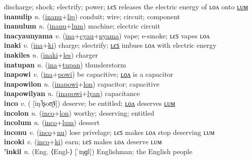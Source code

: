 discharge; shock; electrify; power; ʟєꜱ releases the electric energy of ʟᴏᴧ onto \hyperref[inanulum]{ʟᴜᴍ} \label{inanu} \\
\textbf{inanulip} \textit{n.} (\hyperref[inanu]{inanu}+\hyperref[lip]{lip})
conduit; wire; circuit; component \label{inanulip} \\
\textbf{inanulum} \textit{n.} (\hyperref[inanu]{inanu}+\hyperref[lum]{lum})
machine; electric circuit \label{inanulum} \\
\textbf{inacyaunyama} \textit{v.} (\hyperref[ina]{ina}+\hyperref[cyau]{cyau}+\hyperref[nyama]{nyama})
vape; e-smoke; ʟєꜱ vapes ʟᴏᴧ \label{inacyaunyama} \\
\textbf{inaki} \textit{v.} (\hyperref[ina]{ina}+\hyperref[ki]{ki})
charge; electrify; \hyperref[inakiles]{ʟєꜱ} imbues ʟᴏᴧ with electric energy \label{inaki} \\
\textbf{inakiles} \textit{n.} (\hyperref[inaki]{inaki}+\hyperref[les]{les})
charger \label{inakiles} \\
\textbf{inatupan} \textit{n.} (\hyperref[ina]{ina}+\hyperref[tupan]{tupan})
thunderstorm \label{inatupan} \\
\textbf{inapowi} \textit{v.} (\hyperref[ina]{ina}+\hyperref[powi]{powi})
be capacitive; \hyperref[inapowilon]{ʟᴏᴧ} is a capacitor \label{inapowi} \\
\textbf{inapowilon} \textit{n.} (\hyperref[inapowi]{inapowi}+\hyperref[lon]{lon})
capacitor; capacitive \label{inapowilon} \\
\textbf{inapowilyan} \textit{n.} (\hyperref[inapowi]{inapowi}+\hyperref[lyan]{lyan})
capacitance \label{inapowilyan} \\
\textbf{inco} \textit{v.} ( [iŋ˥ʂoʊ̯˥˩])
deserve; be entitled; \hyperref[incolon]{ʟᴏᴧ} deserves \hyperref[incolum]{ʟᴜᴍ} \label{inco} \\
\textbf{incolon} \textit{n.} (\hyperref[inco]{inco}+\hyperref[lon]{lon})
worthy; deserving; entitled \label{incolon} \\
\textbf{incolum} \textit{n.} (\hyperref[inco]{inco}+\hyperref[lum]{lum})
dessert \label{incolum} \\
\textbf{inconu} \textit{v.} (\hyperref[inco]{inco}+\hyperref[nu]{nu})
lose privelage; ʟєꜱ makes ʟᴏᴧ stop deserving ʟᴜᴍ \label{inconu} \\
\textbf{incoki} \textit{v.} (\hyperref[inco]{inco}+\hyperref[ki]{ki})
earn; ʟєꜱ makes ʟᴏᴧ deserve ʟᴜᴍ \label{incoki} \\
\textbf{'inkil} \textit{n.} (Eng. ⟨Engl-⟩ [ˈɪŋɡl])
Englishman; the English people \label{'inkil} \\
